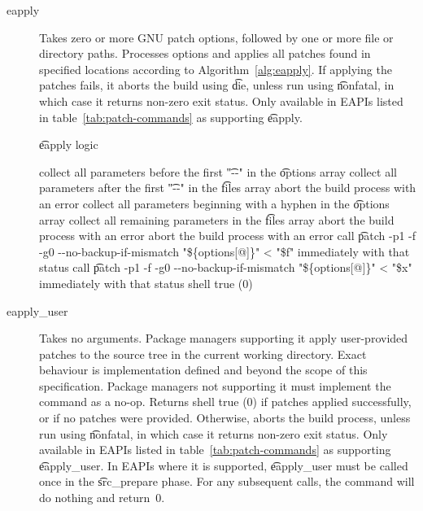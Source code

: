 \begin{description}
\item[eapply]  Takes zero or more GNU patch options, followed by one or more
    file or directory paths. Processes options and applies all patches found in specified locations
    according to Algorithm~\ref{alg:eapply}. If applying the patches fails, it aborts the build
    using \t{die}, unless run using \t{nonfatal}, in which case it returns non-zero exit status.
    Only available in EAPIs listed in table~\ref{tab:patch-commands} as supporting \t{eapply}.

\begin{algorithm}
\caption{\t{eapply} logic} \label{alg:eapply}
\begin{algorithmic}[1]
    \STATE collect all parameters before the first \t{"-{}-"} in the \t{options} array
    \STATE collect all parameters after the first \t{"-{}-"} in the \t{files} array
    \STATE abort the build process with an error
\ELSE
    \STATE collect all parameters beginning with a hyphen in the \t{options} array
    \STATE collect all remaining parameters in the \t{files} array
\ENDIF
{}
    \STATE abort the build process with an error
\ENDIF
{}
            \STATE abort the build process with an error
        \ENDIF
            \STATE call \t{patch -p1 -f -g0 -{}-no-backup-if-mismatch "\$\{options[@]\}" < "\$f"}
                \RETURN immediately with that status
            \ENDIF
        \ENDFOR
    \ELSE
        \STATE call \t{patch -p1 -f -g0 -{}-no-backup-if-mismatch "\$\{options[@]\}" < "\$x"}
            \RETURN immediately with that status
        \ENDIF
    \ENDIF
\ENDFOR
\RETURN shell true (0)
\end{algorithmic}
\end{algorithm}

\item[eapply_user]  Takes no arguments. Package managers supporting it
    apply user-provided patches to the source tree in the current working directory. Exact behaviour
    is implementation defined and beyond the scope of this specification. Package managers not
    supporting it must implement the command as a no-op. Returns shell true (0) if patches applied
    successfully, or if no patches were provided. Otherwise, aborts the build process, unless run
    using \t{nonfatal}, in which case it returns non-zero exit status. Only available in EAPIs
    listed in table~\ref{tab:patch-commands} as supporting \t{eapply_user}. In EAPIs where it is
    supported, \t{eapply_user} must be called once in the \t{src_prepare} phase. For any
    subsequent calls, the command will do nothing and return~0.
\end{description}

